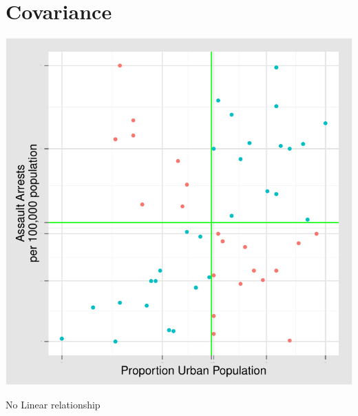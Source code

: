 \documentclass[nohyper,justified]{tufte-handout}\usepackage[]{graphicx}\usepackage[]{color}
\makeatletter
\def\maxwidth{ %
  \ifdim\Gin@nat@width>\linewidth
    \linewidth
  \else
    \Gin@nat@width
  \fi
}
\newenvironment{knitrout}{}{} %
\makeatother
\begin{document}
\section{Covariance}
\begin{knitrout}
\color{fgcolor}\begin{marginfigure}

{\centering \includegraphics[width=\maxwidth]{figure/graphics-scatterplotsxz-1} 

}

\caption[No Linear relationship]{No Linear relationship}\label{fig:scatterplotsxz}
\end{marginfigure}


\end{knitrout}
\end{document}

